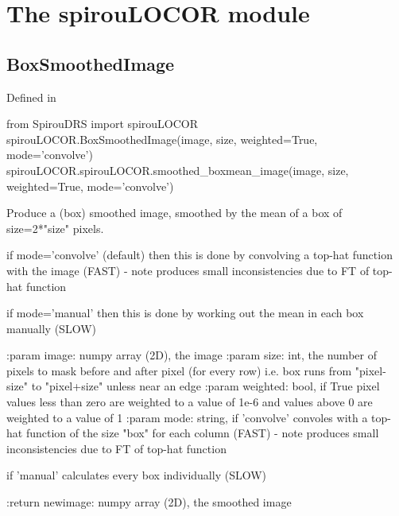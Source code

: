 
\clearpage
\newpage
\noindent\begin{minipage}{\textwidth}
\section{The spirouLOCOR module}
\label{ch:the_module:spirouLOCOR}

\subsection{BoxSmoothedImage}

Defined in \spirouLOCOR{}

\begin{pythonbox}
from SpirouDRS import spirouLOCOR
spirouLOCOR.BoxSmoothedImage(image, size, weighted=True, mode='convolve')
spirouLOCOR.spirouLOCOR.smoothed_boxmean_image(image, size, weighted=True, mode='convolve')
\end{pythonbox}

\begin{pythondocstring}
Produce a (box) smoothed image, smoothed by the mean of a box of
    size=2*"size" pixels.

    if mode='convolve' (default) then this is done
    by convolving a top-hat function with the image (FAST)
    - note produces small inconsistencies due to FT of top-hat function

    if mode='manual' then this is done by working out the mean in each
    box manually (SLOW)

:param image: numpy array (2D), the image
:param size: int, the number of pixels to mask before and after pixel
             (for every row)
             i.e. box runs from  "pixel-size" to "pixel+size" unless
             near an edge
:param weighted: bool, if True pixel values less than zero are weighted to
                 a value of 1e-6 and values above 0 are weighted to a value
                 of 1
:param mode: string, if 'convolve' convoles with a top-hat function of the
                     size "box" for each column (FAST) - note produces small
                     inconsistencies due to FT of top-hat function

                     if 'manual' calculates every box individually (SLOW)

:return newimage: numpy array (2D), the smoothed image
\end{pythondocstring}
\end{minipage}

